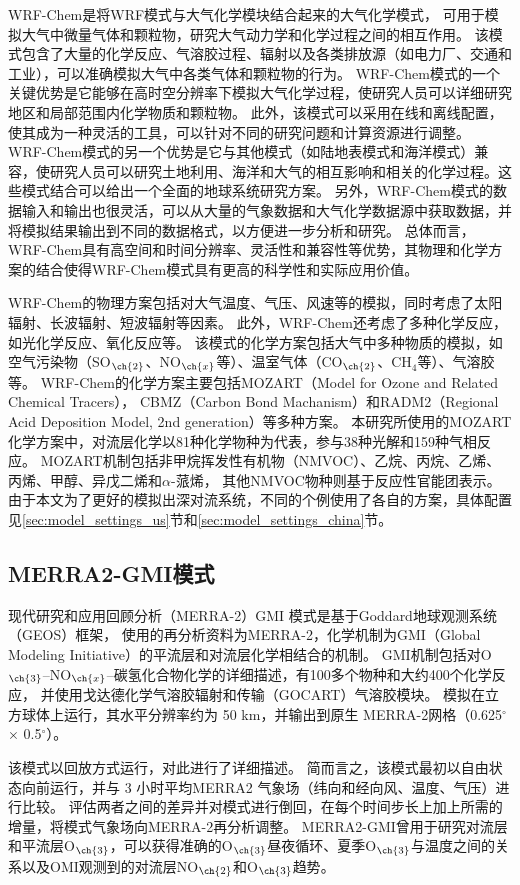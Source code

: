 WRF-Chem是将WRF模式与大气化学模块结合起来的大气化学模式，
可用于模拟大气中微量气体和颗粒物，研究大气动力学和化学过程之间的相互作用。
该模式包含了大量的化学反应、气溶胶过程、辐射以及各类排放源（如电力厂、交通和工业），可以准确模拟大气中各类气体和颗粒物的行为。
WRF-Chem模式的一个关键优势是它能够在高时空分辨率下模拟大气化学过程，使研究人员可以详细研究地区和局部范围内化学物质和颗粒物。
此外，该模式可以采用在线和离线配置，使其成为一种灵活的工具，可以针对不同的研究问题和计算资源进行调整。
WRF-Chem模式的另一个优势是它与其他模式（如陆地表模式和海洋模式）兼容，使研究人员可以研究土地利用、海洋和大气的相互影响和相关的化学过程。这些模式结合可以给出一个全面的地球系统研究方案。
另外，WRF-Chem模式的数据输入和输出也很灵活，可以从大量的气象数据和大气化学数据源中获取数据，并将模拟结果输出到不同的数据格式，以方便进一步分析和研究。
总体而言，WRF-Chem具有高空间和时间分辨率、灵活性和兼容性等优势，其物理和化学方案的结合使得WRF-Chem模式具有更高的科学性和实际应用价值。

WRF-Chem的物理方案包括对大气温度、气压、风速等的模拟，同时考虑了太阳辐射、长波辐射、短波辐射等因素。
此外，WRF-Chem还考虑了多种化学反应，如光化学反应、氧化反应等。
该模式的化学方案包括大气中多种物质的模拟，如空气污染物（SO$_{\ch{2}}$、NO$_{\ch{x}}$等）、温室气体（CO$_{\ch{2}}$、CH$_4$等）、气溶胶等。
WRF-Chem的化学方案主要包括MOZART（Model for Ozone and Related Chemical Tracers），
CBMZ（Carbon Bond Machanism）和RADM2（Regional Acid Deposition Model, 2nd generation）等多种方案。
本研究所使用的MOZART化学方案中，对流层化学以81种化学物种为代表，参与38种光解和159种气相反应\citep{Emmons.2010}。
MOZART机制包括非甲烷挥发性有机物（NMVOC）、乙烷、丙烷、乙烯、丙烯、甲醇、异戊二烯和$\alpha$-蒎烯，
其他NMVOC物种则基于反应性官能团表示。
由于本文为了更好的模拟出深对流系统，不同的个例使用了各自的方案，具体配置见\ref{sec:model_settings_us}节和\ref{sec:model_settings_china}节。

\subsection{MERRA2-GMI模式}

现代研究和应用回顾分析（MERRA-2）GMI 模式是基于Goddard地球观测系统（GEOS）框架\citep{Molod.2015}，
使用的再分析资料为MERRA-2\citep{Gelaro.2017}，化学机制为GMI（Global Modeling Initiative）的平流层和对流层化学相结合的机制\citep{Duncan.2007,Oman.2013,Nielsen.2017}。
GMI机制包括对O$_{\ch{3}}$--NO$_{\ch{x}}$--碳氢化合物化学的详细描述，有100多个物种和大约400个化学反应，
并使用戈达德化学气溶胶辐射和传输（GOCART）气溶胶模块。
模拟在立方球体上运行，其水平分辨率约为 50 km，并输出到原生 MERRA-2网格（0.625$^{\circ}$ $\times$ 0.5$^{\circ}$）。

该模式以回放方式运行，\citet{Orbe.2017}对此进行了详细描述。
简而言之，该模式最初以自由状态向前运行，并与 3 小时平均MERRA2 气象场（纬向和经向风、温度、气压）进行比较。
评估两者之间的差异并对模式进行倒回，在每个时间步长上加上所需的增量，将模式气象场向MERRA-2再分析调整。
MERRA2-GMI曾用于研究对流层和平流层O$_{\ch{3}}$，可以获得准确的O$_{\ch{3}}$昼夜循环、夏季O$_{\ch{3}}$与温度之间的关系以及OMI观测到的对流层NO$_{\ch{2}}$和O$_{\ch{3}}$趋势\citep{Strode.2017,Ziemke.2017,Ziemke.2019}。
